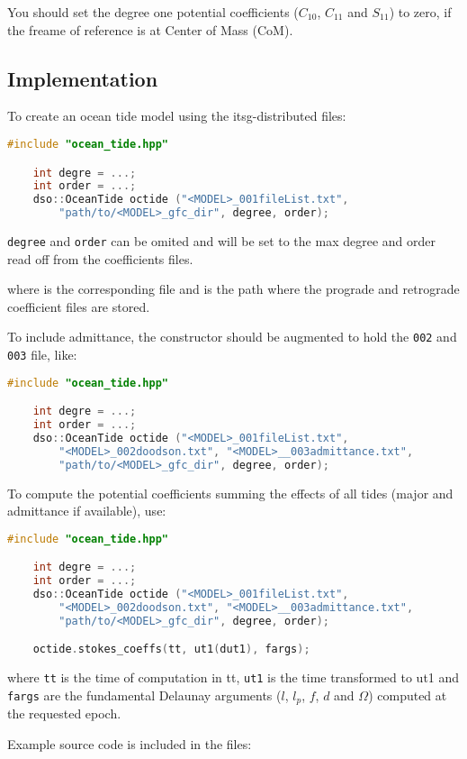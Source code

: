 \begin{warning}
    You should set the degree one potential coefficients ($C_{10}$, $C_{11}$ and $S_{11}$) to zero, 
    if the freame of reference is at Center of Mass (CoM).
\end{warning}

\subsection{Implementation}
To create an ocean tide model using the \gls{itsg}-distributed files:
\begin{lstlisting}[language=C++, basicstyle=\footnotesize\ttfamily, frame=single]
    #include "ocean_tide.hpp"

    int degre = ...;
    int order = ...;
    dso::OceanTide octide ("<MODEL>_001fileList.txt", 
        "path/to/<MODEL>_gfc_dir", degree, order);
\end{lstlisting}

\texttt{degree} and \texttt{order} can be omited and will be set to the max degree and 
order read off from the coefficients files.

where  is the corresponding  file and 
 is the path where the prograde and retrograde coefficient files 
are stored.

To include admittance, the constructor should be augmented to hold the \texttt{002} and \texttt{003} 
file, like:
\begin{lstlisting}[language=C++, basicstyle=\footnotesize\ttfamily, frame=single]
    #include "ocean_tide.hpp"

    int degre = ...;
    int order = ...;
    dso::OceanTide octide ("<MODEL>_001fileList.txt", 
        "<MODEL>_002doodson.txt", "<MODEL>__003admittance.txt", 
        "path/to/<MODEL>_gfc_dir", degree, order);
\end{lstlisting}

To compute the potential coefficients summing the effects of all tides (major and admittance if 
available), use:
\begin{lstlisting}[language=C++, basicstyle=\footnotesize\ttfamily, frame=single]
    #include "ocean_tide.hpp"

    int degre = ...;
    int order = ...;
    dso::OceanTide octide ("<MODEL>_001fileList.txt", 
        "<MODEL>_002doodson.txt", "<MODEL>__003admittance.txt", 
        "path/to/<MODEL>_gfc_dir", degree, order);

    octide.stokes_coeffs(tt, ut1(dut1), fargs);
\end{lstlisting}

where \texttt{tt} is the time of computation in \gls{tt}, \texttt{ut1} is the time transformed to 
\gls{ut1} and \texttt{fargs} are the fundamental Delaunay arguments ($l$, $l_p$, $f$, $d$ and 
$\Omega$) computed at the requested epoch.

Example source code is included in the files: 
